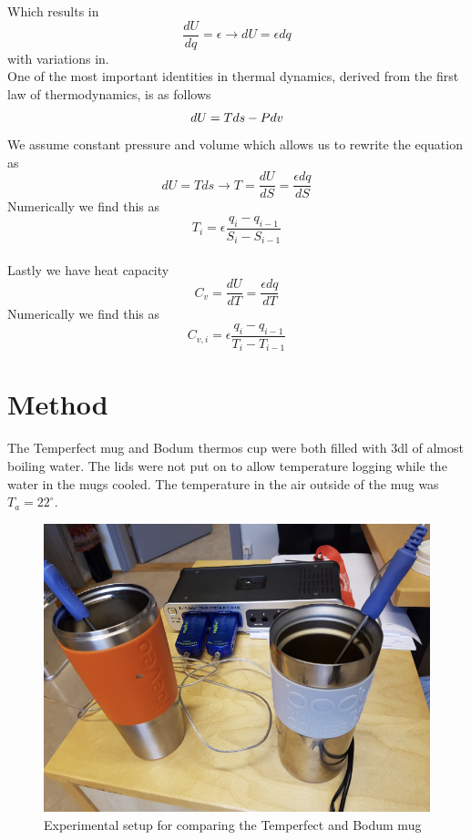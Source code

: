\documentclass[reprint,english,notitlepage]{revtex4-2}
\begin{document}
Which results in
\begin{equation}
  \frac{dU}{dq} = \epsilon \rightarrow dU = \epsilon dq
\end{equation}
with variations in.\\

One of the most important identities in thermal dynamics, derived from the first law of thermodynamics, is as follows
\begin{equation}
dU = Tds - Pdv \\
\end{equation}
We assume constant pressure and volume which allows us to rewrite the equation as
\begin{equation}
  dU = Tds \rightarrow T = \frac{dU}{dS} = \frac{\epsilon dq}{dS}
\end{equation}
Numerically we find this as
\begin{equation}
  T_i = \epsilon\frac{q_i - q_{i -1}}{S_i - S_{i -1}}
\end{equation}
\\
Lastly we have heat capacity
\begin{equation}
C_v = \frac{dU}{dT} = \frac{\epsilon dq}{dT}
\end{equation}
Numerically we find this as
\begin{equation}
  C_{v, i} = \epsilon\frac{q_i - q_{i -1}}{T_i - T_{i -1}}
\end{equation}

\section{Method}
The Temperfect mug and Bodum thermos cup were both filled with 3dl of almost boiling water. The lids were not put on to allow temperature logging while the water in the mugs cooled. The temperature in the air outside of the mug was $T_a = 22^{\circ}$.
\begin{figure}[!htb]
  \includegraphics[scale=0.5]{setup.png}
  \caption{Experimental setup for comparing the Temperfect and Bodum mug}\label{fig:setup}
\end{figure}
\FloatBarrier
\end{document}
